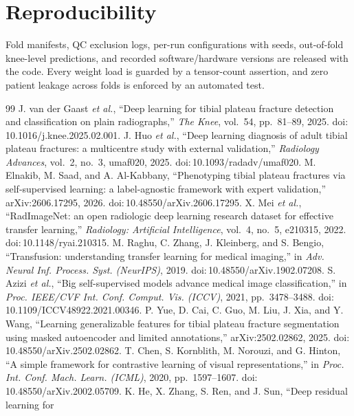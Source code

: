 \documentclass[conference]{IEEEtran}
\begin{document}
\section*{Reproducibility}
Fold manifests, QC exclusion logs, per-run configurations with seeds, out-of-fold
knee-level predictions, and recorded software/hardware versions are released with the
code. Every weight load is guarded by a tensor-count assertion, and zero patient
leakage across folds is enforced by an automated test.

\begin{thebibliography}{99}
 J. van der Gaast \textit{et al.}, ``Deep learning for tibial
plateau fracture detection and classification on plain radiographs,'' \textit{The
Knee}, vol.~54, pp.~81--89, 2025. doi:\,10.1016/j.knee.2025.02.001.
 J. Huo \textit{et al.}, ``Deep learning diagnosis of adult tibial
plateau fractures: a multicentre study with external validation,'' \textit{Radiology
Advances}, vol.~2, no.~3, umaf020, 2025. doi:\,10.1093/radadv/umaf020.
 M. Elnakib, M. Saad, and A. Al-Kabbany, ``Phenotyping tibial
plateau fractures via self-supervised learning: a label-agnostic framework with
expert validation,'' arXiv:2606.17295, 2026. doi:\,10.48550/arXiv.2606.17295.
 X. Mei \textit{et al.}, ``RadImageNet: an open radiologic
deep learning research dataset for effective transfer learning,'' \textit{Radiology:
Artificial Intelligence}, vol.~4, no.~5, e210315, 2022. doi:\,10.1148/ryai.210315.
 M. Raghu, C. Zhang, J. Kleinberg, and S. Bengio,
``Transfusion: understanding transfer learning for medical imaging,'' in \textit{Adv.
Neural Inf. Process. Syst. (NeurIPS)}, 2019. doi:\,10.48550/arXiv.1902.07208.
 S. Azizi \textit{et al.}, ``Big self-supervised models advance
medical image classification,'' in \textit{Proc. IEEE/CVF Int. Conf. Comput. Vis.
(ICCV)}, 2021, pp.~3478--3488. doi:\,10.1109/ICCV48922.2021.00346.
 P. Yue, D. Cai, C. Guo, M. Liu, J. Xia, and Y. Wang, ``Learning
generalizable features for tibial plateau fracture segmentation using masked
autoencoder and limited annotations,'' arXiv:2502.02862, 2025. doi:\,10.48550/arXiv.2502.02862.
 T. Chen, S. Kornblith, M. Norouzi, and G. Hinton, ``A simple
framework for contrastive learning of visual representations,'' in \textit{Proc. Int.
Conf. Mach. Learn. (ICML)}, 2020, pp.~1597--1607. doi:\,10.48550/arXiv.2002.05709.
 K. He, X. Zhang, S. Ren, and J. Sun, ``Deep residual learning for

\end{thebibliography}
\end{document}
